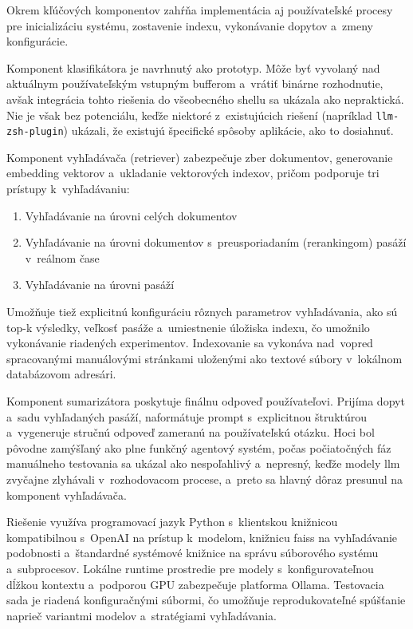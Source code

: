 Okrem kľúčových komponentov zahŕňa implementácia aj používateľské procesy pre inicializáciu systému, zostavenie indexu, vykonávanie dopytov a~zmeny konfigurácie.

Komponent klasifikátora je navrhnutý ako prototyp. Môže byť vyvolaný nad aktuálnym používateľským vstupným bufferom a~vrátiť binárne rozhodnutie, avšak integrácia tohto riešenia do všeobecného shellu sa ukázala ako nepraktická. Nie je však bez potenciálu, keďže niektoré z~existujúcich riešení (napríklad \texttt{llm-zsh-plugin}) ukázali, že existujú špecifické spôsoby aplikácie, ako to dosiahnuť.

Komponent vyhľadávača (retriever) zabezpečuje zber dokumentov, generovanie embedding vektorov a~ukladanie vektorových indexov, pričom podporuje tri prístupy k~vyhľadávaniu:
\begin{enumerate}
  \item Vyhľadávanie na úrovni celých dokumentov
  \item Vyhľadávanie na úrovni dokumentov s~preusporiadaním (rerankingom) pasáží v~reálnom čase
  \item Vyhľadávanie na úrovni pasáží
\end{enumerate}
Umožňuje tiež explicitnú konfiguráciu rôznych parametrov vyhľadávania, ako sú top-k výsledky, veľkosť pasáže a~umiestnenie úložiska indexu, čo umožnilo vykonávanie riadených experimentov. Indexovanie sa vykonáva nad~vopred spracovanými manuálovými stránkami uloženými ako textové súbory v~lokálnom databázovom adresári.

Komponent sumarizátora poskytuje finálnu odpoveď používateľovi. Prijíma dopyt a~sadu vyhľadaných pasáží, naformátuje prompt s~explicitnou štruktúrou a~vygeneruje stručnú odpoveď zameranú na používateľskú otázku. Hoci bol pôvodne zamýšľaný ako plne funkčný agentový systém, počas počiatočných fáz manuálneho testovania sa ukázal ako nespoľahlivý a~nepresný, keďže modely \gls{llm} zvyčajne zlyhávali v~rozhodovacom procese, a~preto sa hlavný dôraz presunul na komponent vyhľadávača.

Riešenie využíva programovací jazyk Python s~klientskou knižnicou kompatibilnou s~OpenAI na prístup k~modelom, knižnicu \gls{faiss} na vyhľadávanie podobnosti a~štandardné systémové knižnice na správu súborového systému a~subprocesov. Lokálne runtime prostredie pre modely s~konfigurovateľnou dĺžkou kontextu a~podporou GPU zabezpečuje platforma Ollama. Testovacia sada je riadená konfiguračnými súbormi, čo umožňuje reprodukovateľné spúšťanie naprieč variantmi modelov a~stratégiami vyhľadávania.

